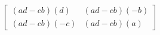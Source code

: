 \documentclass[10pt]{article}
\begin{document}
\[ \left[ \begin{array}{ccc}
(ad-cb)(d) & (ad-cb)(-b)\\
(ad-cb)(-c) & (ad-cb)(a)
\end{array} \right]
\]
\end{document}
